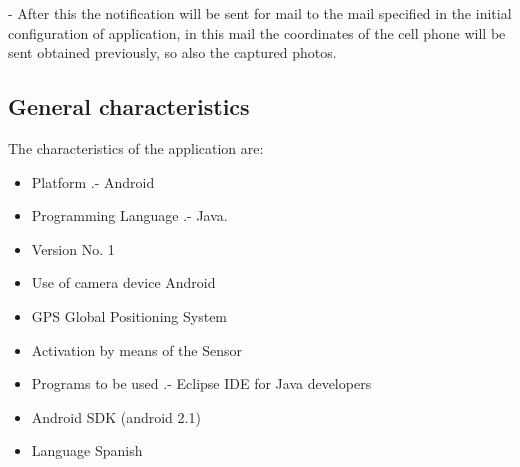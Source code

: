 \documentclass[12pt,letterpaper]{article}
\begin{document}
 - After this the notification will be sent for mail to the mail specified in the initial configuration of application, in this mail the coordinates of the cell phone will be sent obtained previously, so also the captured photos.
 
    
  
   \subsection{General characteristics}
   The characteristics of the application are:
   
   \begin{itemize}
   
   \item Platform .- Android
   \item Programming Language .- Java.
\newpage
   \item Version No. 1
   \item Use of camera device Android
   \item GPS Global Positioning System
   \item Activation by means of the Sensor
   \item Programs to be used .- Eclipse IDE for Java developers
   \item Android SDK (android 2.1)
   \item Language{\tiny } Spanish
   
   
   \end{itemize}
\end{document}
